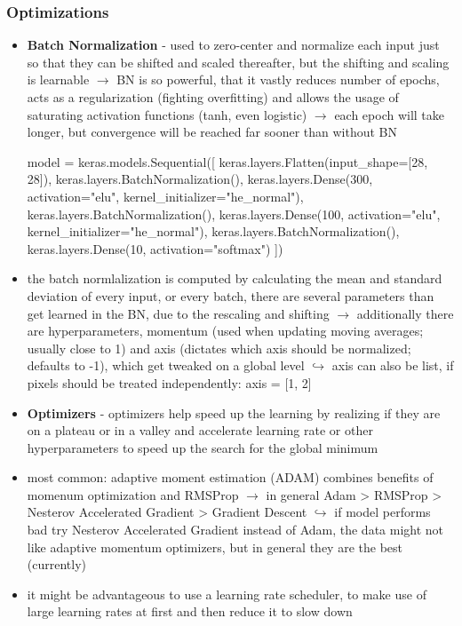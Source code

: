 \documentclass[12pt,a4paper]{article}
\begin{document}
\subsubsection{Optimizations} %
\label{ssub:optimizations}

\begin{itemize} 
  \item \textbf{Batch Normalization} - used to zero-center and normalize each input just so that they can be shifted and scaled thereafter, but the shifting and scaling is learnable
  \newline \indent $\longrightarrow$ BN is so powerful, that it vastly reduces number of epochs, acts as a regularization (fighting overfitting) and allows the usage of saturating activation functions (tanh, even logistic)
  \newline \indent $\longrightarrow$ each epoch will take longer, but convergence will be reached far sooner than without BN
  \begin{python}
    model = keras.models.Sequential([
        keras.layers.Flatten(input_shape=[28, 28]),
        keras.layers.BatchNormalization(),
        keras.layers.Dense(300, activation="elu", 
                          kernel_initializer="he_normal"),
        keras.layers.BatchNormalization(),
        keras.layers.Dense(100, activation="elu", 
                          kernel_initializer="he_normal"),
        keras.layers.BatchNormalization(),
        keras.layers.Dense(10, activation="softmax")
        ])
  \end{python}
  \item the batch normlalization is computed by calculating the mean and standard deviation of every input, or every batch, there are several parameters than get learned in the BN, due to the rescaling and shifting
  \newline \indent $\longrightarrow$ additionally there are hyperparameters, momentum (used when updating moving averages; usually close to 1) and axis (dictates which axis should be normalized; defaults to -1), which get tweaked on a global level
  \newline \indent $\hookrightarrow$ axis can also be list, if pixels should be treated independently: axis = [1, 2] 
  \item \textbf{Optimizers} - optimizers help speed up the learning by realizing if they are on a plateau or in a valley and accelerate learning rate or other hyperparameters to speed up the search for the global minimum
  \item most common: adaptive moment estimation (ADAM) combines benefits of momenum optimization and RMSProp
  \newline \indent $\longrightarrow$ in general Adam > RMSProp > Nesterov Accelerated Gradient > Gradient Descent
  \newline \indent $\hookrightarrow$ if model performs bad try Nesterov Accelerated Gradient instead of Adam, the data might not like adaptive momentum optimizers, but in general they are the best (currently) 
  \item it might be advantageous to use a learning rate scheduler, to make use of large learning rates at first and then reduce it to slow down
\end{itemize}
\end{document}
